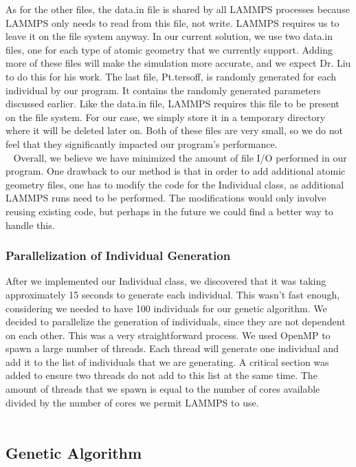 \documentclass[letterpaper, 12pt]{article}
\begin{document}
\begin{flushleft}
As for the other files, the data.in file is shared by all LAMMPS processes because LAMMPS only needs to read from this file, not write. LAMMPS requires us to leave it on the file system anyway. In our current solution, we use two data.in files, one for each type of atomic geometry that we currently support. Adding more of these files will make the simulation more accurate, and we expect Dr. Liu to do this for his work. The last file, Pt.tersoff, is randomly generated for each individual by our program. It contains the randomly generated parameters discussed earlier. Like the data.in file, LAMMPS requires this file to be present on the file system. For our case, we simply store it in a temporary directory where it will be deleted later on. Both of these files are very small, so we do not feel that they significantly impacted our program's performance. \\
~\newline
Overall, we believe we have minimized the amount of file I/O performed in our program. One drawback to our method is that in order to add additional atomic geometry files, one has to modify the code for the Individual class, as additional LAMMPS runs need to be performed. The modifications would only involve reusing existing code, but perhaps in the future we could find a better way to handle this. 

\subsubsection*{Parallelization of Individual Generation}

After we implemented our Individual class, we discovered that it was taking approximately 15 seconds to generate each individual. This wasn't fast enough, considering we needed to have 100 individuals for our genetic algorithm. We decided to parallelize the generation of individuals, since they are not dependent on each other. This was a very straightforward process. We used OpenMP to spawn a large number of threads. Each thread will generate one individual and add it to the list of individuals that we are generating. A critical section was added to ensure two threads do not add to this list at the same time. The amount of threads that we spawn is equal to the number of cores available divided by the number of cores we permit LAMMPS to use. \\
~\newline


\subsection*{Genetic Algorithm}


\end{flushleft}
\end{document}
